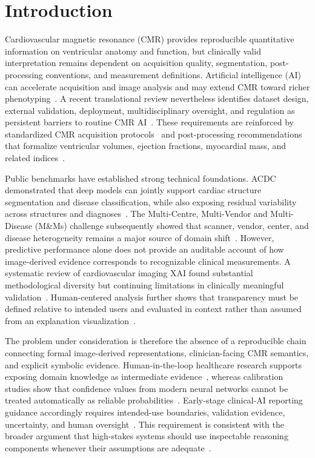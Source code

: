 \documentclass{ceurart}
\begin{document}
\section{Introduction}\label{sec:introduction}

Cardiovascular magnetic resonance (CMR) provides reproducible quantitative information on ventricular anatomy and function, but clinically valid interpretation remains dependent on acquisition quality, segmentation, post-processing conventions, and measurement definitions. Artificial intelligence (AI) can accelerate acquisition and image analysis and may extend CMR toward richer phenotyping~\cite{Patil2026Integrating}. A recent translational review nevertheless identifies dataset design, external validation, deployment, multidisciplinary oversight, and regulation as persistent barriers to routine CMR AI~\cite{Zhang2024Improving}. These requirements are reinforced by standardized CMR acquisition protocols~\cite{Kramer2020Standardized} and post-processing recommendations that formalize ventricular volumes, ejection fractions, myocardial mass, and related indices~\cite{SchulzMenger2020Standardized}.

Public benchmarks have established strong technical foundations. ACDC demonstrated that deep models can jointly support cardiac structure segmentation and disease classification, while also exposing residual variability across structures and diagnoses~\cite{Bernard2018Deep}. The Multi-Centre, Multi-Vendor and Multi-Disease (M\&Ms) challenge subsequently showed that scanner, vendor, center, and disease heterogeneity remains a major source of domain shift~\cite{Campello2021MultiCentre}. However, predictive performance alone does not provide an auditable account of how image-derived evidence corresponds to recognizable clinical measurements. A systematic review of cardiovascular imaging XAI found substantial methodological diversity but continuing limitations in clinically meaningful validation~\cite{Haupt2025Explainable}. Human-centered analysis further shows that transparency must be defined relative to intended users and evaluated in context rather than assumed from an explanation visualization~\cite{Chen2022HumanCentered}.

The problem under consideration is therefore the absence of a reproducible chain connecting formal image-derived representations, clinician-facing CMR semantics, and explicit symbolic evidence. Human-in-the-loop healthcare research supports exposing domain knowledge as intermediate evidence~\cite{Radiuk2022Human}, whereas calibration studies show that confidence values from modern neural networks cannot be treated automatically as reliable probabilities~\cite{Guo2017Calibration}. Early-stage clinical-AI reporting guidance accordingly requires intended-use boundaries, validation evidence, uncertainty, and human oversight~\cite{Vasey2022DECIDEAI}. This requirement is consistent with the broader argument that high-stakes systems should use inspectable reasoning components whenever their assumptions are adequate~\cite{Rudin2019Stop}.
\end{document}
